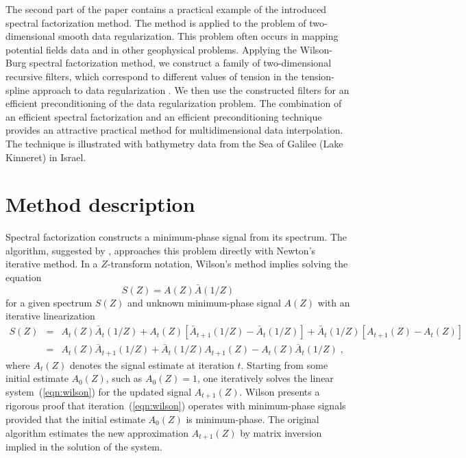 The second part of the paper contains a practical example of the
introduced spectral factorization method. The method is applied to the
problem of two-dimensional smooth data regularization. This problem
often occurs in mapping potential fields data and in other geophysical
problems. Applying the Wilson-Burg spectral factorization method, we
construct a family of two-dimensional recursive filters, which
correspond to different values of tension in the tension-spline
approach to data regularization \cite[]{GEO55-03-02930305}. We then use
the constructed filters for an efficient preconditioning of the data
regularization problem. The combination of an efficient spectral factorization
and an efficient preconditioning technique provides an attractive practical
method for multidimensional data interpolation. The technique is illustrated
with bathymetry data from the Sea of Galilee (Lake Kinneret) in Israel.

\section{Method description}

Spectral factorization constructs a minimum-phase signal from its
spectrum.  The algorithm, suggested by \cite{mywilson}, approaches
this problem directly with Newton's iterative method. In a
$Z$-transform notation, Wilson's method implies solving the equation
\begin{equation}
S(Z) = A(Z)\bar{A}(1/Z)
\label{eqn:specfac}
\end{equation}
for a given spectrum $S(Z)$ and unknown minimum-phase signal $A(Z)$
with an iterative linearization
\begin{eqnarray}
\nonumber
S(Z) & = & A_t(Z)\bar A_t(1/Z)+
     A_t(  Z)[\bar A_{t+1}(1/Z)-\bar A_t(1/Z)]+
\bar A_t(1/Z)[     A_{t+1}(  Z)-     A_t(  Z)] \\
& = & A_t(  Z) \bar A_{t+1}(1/Z) + \bar A_t(1/Z) A_{t+1}(Z)
- A_t(Z)\bar A_t(1/Z)
\;,
\label{eqn:wilson}
\end{eqnarray}
where $A_t(Z)$ denotes the signal estimate at iteration $t$. Starting from
some initial estimate $A_0(Z)$, such as $A_0(Z)=1$, one iteratively solves the
linear system~(\ref{eqn:wilson}) for the updated signal $A_{t+1}(Z)$. Wilson
 presents a rigorous proof that
iteration~(\ref{eqn:wilson}) operates with minimum-phase signals provided that
the initial estimate $A_0(Z)$ is minimum-phase. The original algorithm
estimates the new approximation $A_{t+1}(Z)$ by matrix inversion implied in
the solution of the system.

